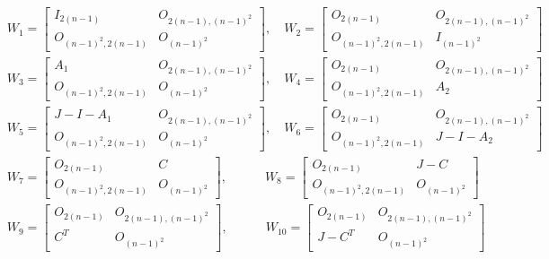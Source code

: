 \begin{align*}
    &W_1 = \begin{bmatrix}
        I_{2(n-1)} & O_{2(n-1), (n-1)^2} \\
        O_{(n-1)^2, 2(n-1)} & O_{(n-1)^2}
    \end{bmatrix}, \quad
    W_2 = \begin{bmatrix}
        O_{2(n-1)} & O_{2(n-1), (n-1)^2} \\
        O_{(n-1)^2, 2(n-1)} & I_{(n-1)^2}
    \end{bmatrix}\\
    &W_3 = \begin{bmatrix}
        A_1 & O_{2(n-1), (n-1)^2} \\
        O_{(n-1)^2, 2(n-1)} & O_{(n-1)^2}
    \end{bmatrix}, \quad
    W_4 = \begin{bmatrix}
        O_{2(n-1)} & O_{2(n-1), (n-1)^2} \\
        O_{(n-1)^2, 2(n-1)} & A_2
    \end{bmatrix}\\
    &W_5 = \begin{bmatrix}
        J-I-A_1 & O_{2(n-1), (n-1)^2} \\
        O_{(n-1)^2, 2(n-1)} & O_{(n-1)^2}
    \end{bmatrix}, \quad
    W_6 = \begin{bmatrix}
        O_{2(n-1)} & O_{2(n-1), (n-1)^2} \\
        O_{(n-1)^2, 2(n-1)} & J-I-A_2
    \end{bmatrix}\\
    &W_7 = \begin{bmatrix}
        O_{2(n-1)} & C \\
        O_{(n-1)^2, 2(n-1)} & O_{(n-1)^2}
    \end{bmatrix}, \quad\quad\quad
    W_8 = \begin{bmatrix}
        O_{2(n-1)} & J-C \\
        O_{(n-1)^2, 2(n-1)} & O_{(n-1)^2}
    \end{bmatrix}\\
    &W_9 = \begin{bmatrix}
        O_{2(n-1)} & O_{2(n-1), (n-1)^2} \\
        C^T & O_{(n-1)^2}
    \end{bmatrix}, \quad\quad\quad
    W_{10} = \begin{bmatrix}
        O_{2(n-1)} & O_{2(n-1), (n-1)^2} \\
        J-C^T & O_{(n-1)^2}
    \end{bmatrix}\\
\end{align*}

